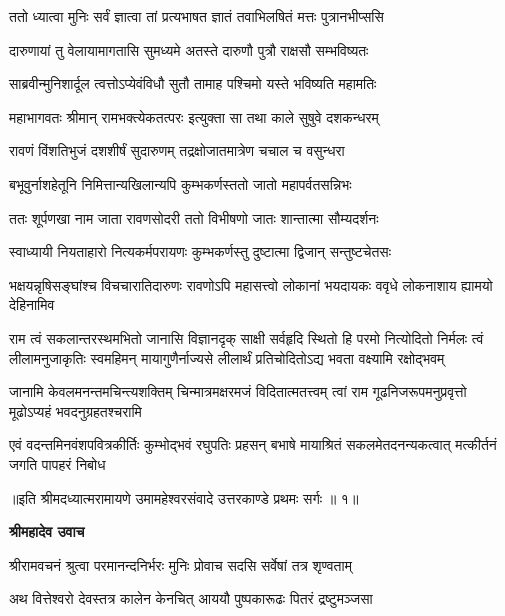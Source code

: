 \twolineshloka
{ततो ध्यात्वा मुनिः सर्वं ज्ञात्वा तां प्रत्यभाषत}
{ज्ञातं तवाभिलषितं मत्तः पुत्रानभीप्ससि} %

\twolineshloka
{दारुणायां तु वेलायामागतासि सुमध्यमे}
{अतस्ते दारुणौ पुत्रौ राक्षसौ सम्भविष्यतः} %

\twolineshloka
{साब्रवीन्मुनिशार्दूल त्वत्तोऽप्येवंविधौ सुतौ}
{तामाह पश्चिमो यस्ते भविष्यति महामतिः} %

\twolineshloka
{महाभागवतः श्रीमान् रामभक्त्येकतत्परः}
{इत्युक्ता सा तथा काले सुषुवे दशकन्धरम्} %

\twolineshloka
{रावणं विंशतिभुजं दशशीर्षं सुदारुणम्}
{तद्रक्षोजातमात्रेण चचाल च वसुन्धरा} %

\twolineshloka
{बभूवुर्नाशहेतूनि निमित्तान्यखिलान्यपि}
{कुम्भकर्णस्ततो जातो महापर्वतसन्निभः} %

\twolineshloka
{ततः शूर्पणखा नाम जाता रावणसोदरी}
{ततो विभीषणो जातः शान्तात्मा सौम्यदर्शनः} %

\twolineshloka
{स्वाध्यायी नियताहारो नित्यकर्मपरायणः}
{कुम्भकर्णस्तु दुष्टात्मा द्विजान् सन्तुष्टचेतसः} %

\threelineshloka
{भक्षयन्नृषिसङ्घांश्च विचचारातिदारुणः}
{रावणोऽपि महासत्त्वो लोकानां भयदायकः}
{ववृधे लोकनाशाय ह्यामयो देहिनामिव} %

\fourlineindentedshloka
{राम त्वं सकलान्तरस्थमभितो जानासि विज्ञानदृक्}
{साक्षी सर्वहृदि स्थितो हि परमो नित्योदितो निर्मलः}
{त्वं लीलामनुजाकृतिः स्वमहिमन् मायागुणैर्नाज्यसे}
{लीलार्थं प्रतिचोदितोऽद्य भवता वक्ष्यामि रक्षोद्भवम्} %

\fourlineindentedshloka
{जानामि केवलमनन्तमचिन्त्यशक्तिम्}
{चिन्मात्रमक्षरमजं विदितात्मतत्त्वम्}
{त्वां राम गूढनिजरूपमनुप्रवृत्तो}
{मूढोऽप्यहं भवदनुग्रहतश्चरामि} %

\fourlineindentedshloka
{एवं वदन्तमिनवंशपवित्रकीर्तिः}
{कुम्भोद्भवं रघुपतिः प्रहसन् बभाषे}
{मायाश्रितं सकलमेतदनन्यकत्वात्}
{मत्कीर्तनं जगति पापहरं निबोध} %

{॥इति श्रीमदध्यात्मरामायणे उमामहेश्वरसंवादे उत्तरकाण्डे
प्रथमः सर्गः ॥ १॥
}




\textbf{श्रीमहादेव उवाच}

\twolineshloka
{श्रीरामवचनं श्रुत्वा परमानन्दनिर्भरः}
{मुनिः प्रोवाच सदसि सर्वेषां तत्र शृण्वताम्} %

\twolineshloka
{अथ वित्तेश्वरो देवस्तत्र कालेन केनचित्}
{आययौ पुष्पकारूढः पितरं द्रष्टुमञ्जसा} %

